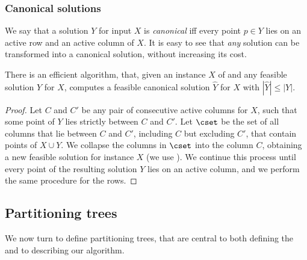 %



\subsubsection{Canonical solutions} 
We say that a solution $Y$ for input $X$ is \emph{canonical} iff every point $p\in Y$ lies on an active row and an active column of $X$. %
%
It is easy to see that \emph{any} solution can be transformed into a canonical solution, without increasing its cost. %

\begin{myobs} \label{obs: canonical solutions} There is an efficient algorithm, that, given an instance $X$ of \minsat and
	 any feasible solution $Y$ for $X$, computes a feasible canonical solution $\hat{Y}$ for $X$ with $|\hat{Y}| \leq |Y|$.  %
\end{myobs} 
\begin{proof}
Let $C$ and $C'$ be any pair of consecutive active columns for $X$, such that some point of $Y$ lies strictly between $C$ and $C'$. Let $\cset$ be the set of all columns that lie between $C$ and $C'$, including $C$ but excluding $C'$, that contain points of $X\cup Y$. We collapse the columns in $\cset$ into the column $C$, obtaining a new feasible solution for instance $X$ (we use ). We continue this process until every point of the resulting solution $Y$ lies on an active column, and we perform the same procedure for the rows.
\end{proof}

\subsection{Partitioning trees}

We now turn to define partitioning trees, that are central to both defining the \WBone and to describing our algorithm.

